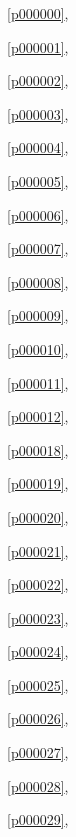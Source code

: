 ﻿



\noindent\figurename\ \ref{p000000},\ \pageref{p000000}

\noindent\figurename\ \ref{p000001},\ \pageref{p000001}

\noindent\figurename\ \ref{p000002},\ \pageref{p000002}

\noindent\figurename\ \ref{p000003},\ \pageref{p000003}

\noindent\figurename\ \ref{p000004},\ \pageref{p000004}

\noindent\figurename\ \ref{p000005},\ \pageref{p000005}

\noindent\figurename\ \ref{p000006},\ \pageref{p000006}

\noindent\figurename\ \ref{p000007},\ \pageref{p000007}

\noindent\figurename\ \ref{p000008},\ \pageref{p000008}

\noindent\figurename\ \ref{p000009},\ \pageref{p000009}

\noindent\figurename\ \ref{p000010},\ \pageref{p000010}

\noindent\figurename\ \ref{p000011},\ \pageref{p000011}

\noindent\figurename\ \ref{p000012},\ \pageref{p000012}

\noindent\figurename\ \ref{p000018},\ \pageref{p000018}

\noindent\figurename\ \ref{p000019},\ \pageref{p000019}

\noindent\figurename\ \ref{p000020},\ \pageref{p000020}

\noindent\figurename\ \ref{p000021},\ \pageref{p000021}

\noindent\figurename\ \ref{p000022},\ \pageref{p000022}

\noindent\figurename\ \ref{p000023},\ \pageref{p000023}

\noindent\figurename\ \ref{p000024},\ \pageref{p000024}

\noindent\figurename\ \ref{p000025},\ \pageref{p000025}

\noindent\figurename\ \ref{p000026},\ \pageref{p000026}

\noindent\figurename\ \ref{p000027},\ \pageref{p000027}

\noindent\figurename\ \ref{p000028},\ \pageref{p000028}

\noindent\figurename\ \ref{p000029},\ \pageref{p000029}

